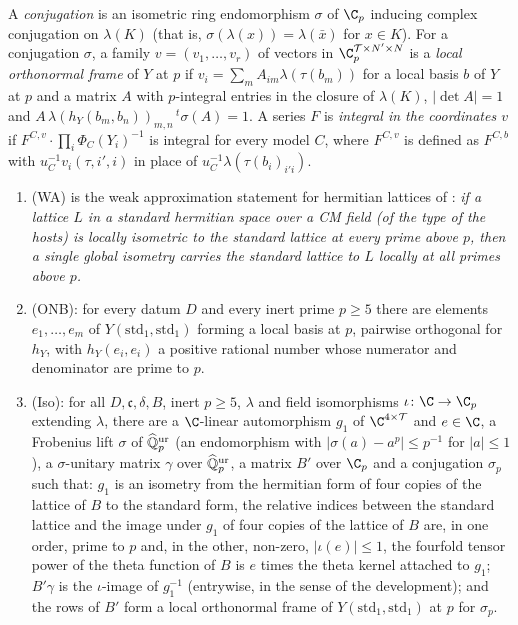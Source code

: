 A \emph{conjugation} is an isometric ring endomorphism $\sigma$ of $\C_p$ inducing complex conjugation on $\lambda(K)$
(that is, $\sigma(\lambda(x))=\lambda(\bar x)$ for $x\in K$). For a conjugation $\sigma$, a family
$v=(v_1,\dots,v_r)$ of vectors in $\C_p^{\mathcal T\times N'\times N}$ is a \emph{local orthonormal frame} of $Y$ at $p$ if
$v_i=\sum_mA_{im}\lambda(\tau(b_m))$ for a local basis $b$ of $Y$ at $p$ and a matrix $A$ with $p$-integral entries in the
closure of $\lambda(K)$, $|\det A|=1$ and $A\,\lambda(h_Y(b_m,b_n))_{m,n}\,{}^t\sigma(A)=1$. A series $F$ is
\emph{integral in the coordinates $v$} if $F^{C,v}\cdot\prod_i\Phi_C(Y_i)^{-1}$ is integral for every model $C$, where
$F^{C,v}$ is defined as $F^{C,b}$ with $u_C^{-1}v_i(\tau,i',i)$ in place of $u_C^{-1}\lambda(\tau(b_i)_{i'i})$.

\begin{definition}\label{pf:reckernel:def-WA}
\begin{enumerate}
\item \textup{(WA)} is the weak approximation statement for hermitian lattices of
  : \emph{if a lattice $L$ in a standard hermitian space over a CM field (of the
  type of the hosts) is
  locally isometric to the standard lattice at every prime above $p$, then a single global isometry carries the standard
  lattice to $L$ locally at all primes above $p$.}
\item \textup{(ONB)}: for every datum $D$ and every inert prime $p\ge5$ there are elements $e_1,\dots,e_m$ of
  $Y(\mathrm{std}_1,\mathrm{std}_1)$ forming a local basis at $p$, pairwise orthogonal for $h_Y$, with
  $h_Y(e_i,e_i)$ a positive rational number whose numerator and denominator are prime to $p$.
\item \textup{(Iso)}: for all $D,\mathfrak c,\delta,B$, inert $p\ge5$, $\lambda$ and field isomorphisms $\iota\colon\C\to\C_p$
  extending $\lambda$, there are a $\C$-linear automorphism $g_1$ of $\C^{4\times\mathcal T}$ and $e\in\C$, a Frobenius lift
  $\sigma$ of $\widehat{\mathbb{Q}}{}_p^{\mathrm{ur}}$ (an endomorphism with $|\sigma(a)-a^p|\le p^{-1}$ for $|a|\le1$), a $\sigma$-unitary matrix
  $\gamma$ over $\widehat{\mathbb{Q}}{}_p^{\mathrm{ur}}$, a matrix $B'$ over $\C_p$ and a conjugation $\sigma_p$ such that: $g_1$ is an isometry from the
  hermitian form of four copies of the lattice of $B$ to the standard form, the relative indices between the standard
  lattice and the image under $g_1$ of four copies of the lattice of $B$ are, in one order, prime to $p$ and, in the
  other, non-zero, $|\iota(e)|\le1$, the fourfold tensor
  power of the theta function of $B$ is $e$ times the theta kernel attached to $g_1$; $B'\gamma$ is the $\iota$-image of
  $g_1^{-1}$ (entrywise, in the sense of the development); and the rows of $B'$ form a local orthonormal frame of
  $Y(\mathrm{std}_1,\mathrm{std}_1)$ at $p$ for $\sigma_p$.
\end{enumerate}
\end{definition}


